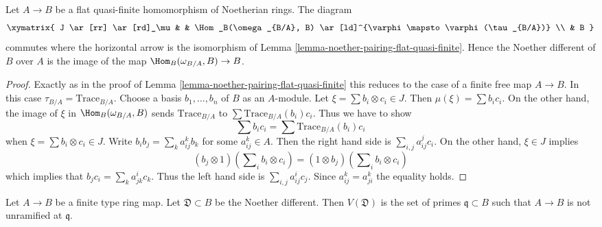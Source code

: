 \begin{lemma}
\label{lemma-noether-different-flat-quasi-finite}
Let $A \to B$ be a flat quasi-finite homomorphism of Noetherian rings.
The diagram
$$
\xymatrix{
J \ar[rr] \ar[rd]_\mu & &
\Hom_B(\omega_{B/A}, B) \ar[ld]^{\varphi \mapsto \varphi(\tau_{B/A})} \\
& B
}
$$
commutes where the horizontal arrow is the isomorphism of
Lemma \ref{lemma-noether-pairing-flat-quasi-finite}.
Hence the Noether different of $B$ over $A$
is the image of the map $\Hom_B(\omega_{B/A}, B) \to B$.
\end{lemma}

\begin{proof}
Exactly as in the proof of Lemma \ref{lemma-noether-pairing-flat-quasi-finite}
this reduces to the case of a finite free map $A \to B$.
In this case $\tau_{B/A} = \text{Trace}_{B/A}$.
Choose a basis $b_1, \ldots, b_n$ of $B$ as an $A$-module.
Let $\xi = \sum b_i \otimes c_i \in J$. Then $\mu(\xi) = \sum b_i c_i$.
On the other hand, the image of $\xi$ in $\Hom_B(\omega_{B/A}, B)$
sends $\text{Trace}_{B/A}$ to $\sum \text{Trace}_{B/A}(b_i)c_i$.
Thus we have to show
$$
\sum b_ic_i = \sum \text{Trace}_{B/A}(b_i)c_i
$$
when $\xi = \sum b_i \otimes c_i \in J$. Write $b_i b_j = \sum_k a_{ij}^k b_k$
for some $a_{ij}^k \in A$. Then the right hand side is
$\sum_{i, j} a_{ij}^j c_i$. On the other hand, $\xi \in J$ implies
$$
(b_j \otimes 1)(\sum\nolimits_i b_i \otimes c_i) =
(1 \otimes b_j)(\sum\nolimits_i b_i \otimes c_i)
$$
which implies that $b_j c_i = \sum_k a_{jk}^i c_k$. Thus the left hand side
is $\sum_{i, j} a_{ij}^i c_j$. Since $a_{ij}^k = a_{ji}^k$ the equality holds.
\end{proof}

\begin{lemma}
\label{lemma-noether-different}
Let $A \to B$ be a finite type ring map. Let $\mathfrak{D} \subset B$
be the Noether different. Then $V(\mathfrak{D})$ is the set of primes
$\mathfrak q \subset B$ such that $A \to B$ is not unramified at $\mathfrak q$.
\end{lemma}

